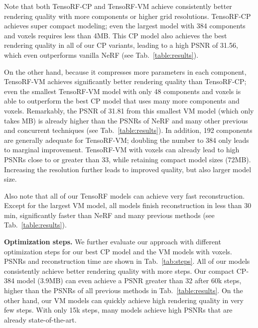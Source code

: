 \documentclass[runningheads]{llncs}
\newcommand{\boldstartspace}[1]{\vspace{0.1in}\noindent\textbf{#1}}
\begin{document}
Note that both TensoRF-CP and TensoRF-VM achieve consistently better rendering quality with more components or higher grid resolutions. 
TensoRF-CP achieves super compact modeling; even the largest model with 384 components and  voxels requires less than 4MB.
This CP model also achieves the best rendering quality in all of our CP variants, leading to a high PSNR of 31.56, which even outperforms vanilla NeRF (see Tab.~\ref{table:results}).

On the other hand, because it compresses more parameters in each component, TensoRF-VM achieves significantly better rendering quality than TensoRF-CP; even the smallest TensoRF-VM model with only 48 components and  voxels is able to outperform the best CP model that uses many more components and voxels.
Remarkably, the PSNR of 31.81 from this smallest VM model (which only takes  MB) is already higher than the PSNRs of NeRF and many other previous and concurrent techniques (see Tab.~\ref{table:results}). 
In addition, 192 components are generally adequate for TensoRF-VM; doubling the number to 384 only leads to marginal improvement. 
TensoRF-VM with  voxels can already lead to high PSNRs close to or greater than 33, while retaining compact model sizes (72MB).
Increasing the resolution further leads to improved quality, but also larger model size.

Also note that all of our TensoRF models can achieve very fast reconstruction. Except for the largest VM model, all models finish reconstruction in less than 30 min, significantly faster than NeRF and many previous methods (see Tab.~\ref{table:results}). 


\boldstartspace{Optimization steps.}
We further evaluate our approach with different optimization steps for our best CP model and the VM models with  voxels. PSNRs and reconstruction time are shown in Tab.~\ref{tab:steps}.
All of our models consistently achieve better rendering quality with more steps.
Our compact CP-384 model (3.9MB) can even achieve a PSNR greater than 32 after 60k steps, higher than the PSNRs of all previous methods in Tab.~\ref{table:results}.
On the other hand, our VM models can quickly achieve high rendering quality in very few steps. With only 15k steps, many models achieve high PSNRs that are already state-of-the-art.



\newcommand{\gold}[1]{\colorbox{gold}{{#1}}}
\newcommand{\silve}[1]{\colorbox{silve}{{#1}}}
\newcommand{\bronze}[1]{\colorbox{bronze}{{#1}}}
\end{document}
